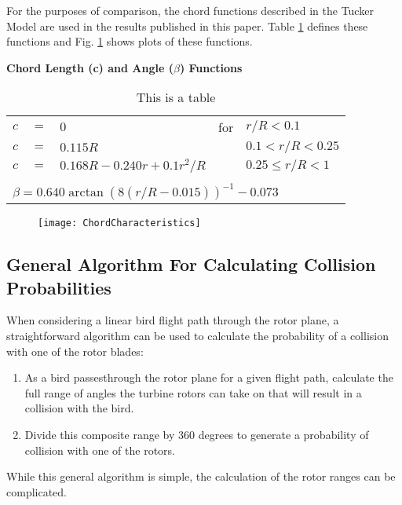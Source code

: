 \label{} \documentclass[10pt,conference]{IEEEtran}
\begin{document}
For the purposes of comparison, the chord functions described in the Tucker Model are used in the results published in
this paper. Table \ref{ChordFunctions} defines these functions and Fig. \ref{fig.ChordCharacteristics} shows plots of
these functions.
\begin{table}
  \centering
  \textbf{Chord Length (c) and Angle ($\beta$) Functions}\\
    \begin{tabular}{|lllll|}
  \hline
    $c$ & $=$ & $0$ & for & $r/R< 0.1$ \\
    $c$ & $=$ & $0.115R$ && $0.1 < r/R < 0.25$ \\
    $c$ & $=$ & $0.168R-0.240r+0.1r^2/R$ && $0.25 \leq r/R < 1$ \\
    &&&&\\
    \multicolumn{5}{|l|}{$\beta = 0.640 \arctan(8(r/R-0.015))^{-1}-0.073$}\\
  \hline
    \end{tabular}
  \caption{This is a table}\label{ChordFunctions}
\end{table}

\begin{figure}
   \centering
   \texttt{[image: ChordCharacteristics]}
   \caption{}
   \label{fig.ChordCharacteristics}
\end{figure}

\subsection{General Algorithm For Calculating Collision Probabilities}
When considering a linear bird flight path through the rotor plane, a straightforward algorithm can be used to
calculate the probability of a collision with one of the rotor blades:
\begin{enumerate}
  \item As a bird passesthrough the rotor plane for a given flight path, calculate the full range of angles the turbine rotors can take on that will result in a collision with the bird.
  \item Divide this composite range by 360 degrees to generate a probability of collision with one of the rotors.
\end{enumerate}
While this general algorithm is simple, the calculation of the rotor ranges can be complicated.
\end{document}
